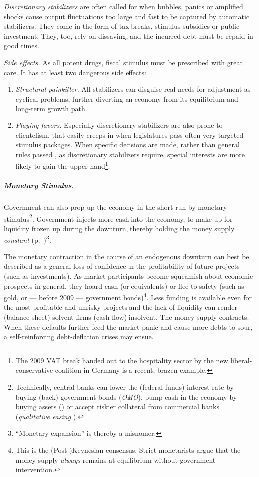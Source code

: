 \emph{Discretionary stabilizers} are often called for when bubbles, panics or amplified shocks cause output fluctuations too large and fast to be captured by automatic stabilizers. They come in the form of tax breaks, stimulus subsidies or public investment. They, too, rely on dissaving, and the incurred debt must be repaid in good times. 

\emph{Side effects.} As all potent drugs, fiscal stimulus must be prescribed with great care. It has at least two dangerous side effects:
\begin{enumerate}
	\item \emph{Structural painkiller.} All stabilizers can disguise real needs for adjustment as cyclical problems, further diverting an economy from its equilibrium and long-term growth path.  
	\item \emph{Playing favors.} Especially discretionary stabilizers are also prone to clientelism, that easily creeps in when legislatures pass often very targeted stimulus packages. When specific decisions are made, rather than general rules passed \citep{Weber-1918-aa}, as discretionary stabilizers require, special interests are more likely to gain the upper hand\footnote{
		The 2009 \gls{VAT} break handed out to the hospitality sector by the new liberal-conservative coalition in Germany is a recent, brazen example.}.
\end{enumerate}

\subparagraph{Monetary Stimulus.}  \label{sec:monetary-stimulus}
Government can also prop up the economy in the short run by monetary stimulus\footnote{
	Technically, central banks can lower the (federal funds) interest rate by buying (back) government bonds (\emph{\gls{OMO}}), pump cash in the economy by buying assets () or accept riskier collateral from commercial banks (\emph{qualitative easing} \citep{Buiter2008}).}. 
Government injects more cash into the economy, to make up for liquidity frozen up during the downturn, thereby \hyperref[sec:price-stability]{holding the money supply \emph{constant}} (p.~\pageref{sec:price-stability})\footnote{
	``Monetary expansion'' is thereby a misnomer.}.

The monetary contraction in the course of an endogenous downturn can best be described as a general loss of confidence in the profitability of future projects (such as investments). As market participants become squeamish about economic prospects in general, they hoard cash (or equivalents) or flee to safety (such as gold, or --- before 2009 --- government bonds)\footnote{
	This is the (Post-)Keynesian consensus. Strict monetarists argue that the money supply \emph{always} remains at equilibrium without government intervention.}. 
Less funding is available even for the most profitable and unrisky projects and the lack of liquidity can render (balance sheet) solvent firms (cash flow) insolvent. The money supply contracts. When these defaults further feed the market panic and cause more debts to sour, a self-reinforcing debt-deflation crises may ensue. %

